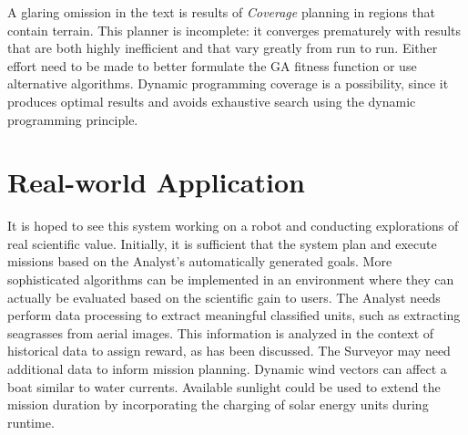 \documentclass{tamuccthesis}
\begin{document}
A glaring omission in the text is results of \textit{Coverage} planning in regions that contain terrain. This planner is incomplete: it converges prematurely with results that are both highly inefficient and that vary greatly from run to run. Either effort need to be made to better formulate the GA fitness function or use alternative algorithms. Dynamic programming coverage is a possibility, since it produces optimal results and avoids exhaustive search using the dynamic programming principle. 

\section{Real-world Application}

It is hoped to see this system working on a robot and conducting explorations of real scientific value. Initially, it is sufficient that the system plan and execute missions based on the Analyst's automatically generated goals. More sophisticated algorithms can be implemented in an environment where they can actually be evaluated based on the scientific gain to users. The Analyst needs perform data processing to extract meaningful classified units, such as extracting seagrasses from aerial images. This information is analyzed in the context of historical data to assign reward, as has been discussed. The Surveyor may need additional data to inform mission planning. Dynamic wind vectors can affect a boat similar to water currents. Available sunlight could be used to extend the mission duration by incorporating the charging of solar energy units during runtime.  
\end{document}
